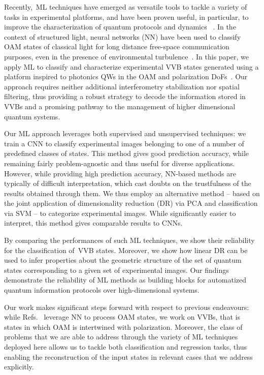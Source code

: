  Recently,~\ac{ML} techniques have emerged as versatile tools to tackle a variety of tasks in experimental platforms, and have been proven useful, in particular, to improve the characterization of quantum protocols and dynamics ~\cite{
 carrasquilla2019reconstructing,
 tairelly,
 agresti2019pattern,lumino2018,rocchetto2019,butler2018,fischer2006,melnikov,wangpaesani}.
In the context of structured light, %
neural networks (NN) have been used to classify \ac{OAM} states of classical light for long distance free-space communication purposes, even in the presence of environmental turbulence~\cite{krenn_2014,krenn_2016,Doster_17,
Park_18, Lohani_turbo_18, Li_18}.
In this paper, we apply \ac{ML} to classify and characterize experimental \ac{VVB} states generated using a platform inspired  to photonics \acp{QW} in the \ac{OAM} and polarization DoFs~\cite{Innocenti2017,giordani_2018}. {Our approach requires neither additional interferometry stabilization nor spatial filtering, thus providing a robust strategy to decode the information stored in \acp{VVB} and a promising pathway to the management of higher dimensional quantum systems}. 

Our \ac{ML} approach leverages both supervised and unsupervised techniques: we  train a \ac{CNN} to classify experimental images belonging to one of a number of predefined classes of states. This method gives good prediction accuracy, while remaining fairly problem-agnostic and thus useful for diverse applications. However, while providing high prediction accuracy, NN-based methods are typically of difficult interpretation, which cast doubts on the trustfulness of the results obtained through them. We thus employ an alternative method -- based on the joint application of dimensionality reduction (DR) via \ac{PCA} and classification via \ac{SVM} -- to categorize experimental images. While significantly easier to interpret, this method gives comparable results to \acp{CNN}.

By comparing the performances of such \ac{ML} techniques, we show their reliability for the classification of~\ac{VVB} states. Moreover, we show how linear DR can be used to infer properties about the geometric structure of the set of quantum states corresponding to a given set of experimental images.
Our findings demonstrate the reliability of \ac{ML} methods as building blocks for automatized quantum information protocols over high-dimensional systems. 

Our work makes significant steps forward  with respect to previous endeavours: while Refs.~\cite{krenn_2014,krenn_2016,Doster_17, Park_18, Lohani_turbo_18, Li_18} leverage NN to process OAM states, we work on VVBs, that is states in which OAM is intertwined with polarization. Moreover, the class of problems that we are able to address through the variety of ML techniques deployed here allows us to tackle both classification and regression tasks, thus enabling the reconstruction of the input states in relevant cases that we address explicitly.


